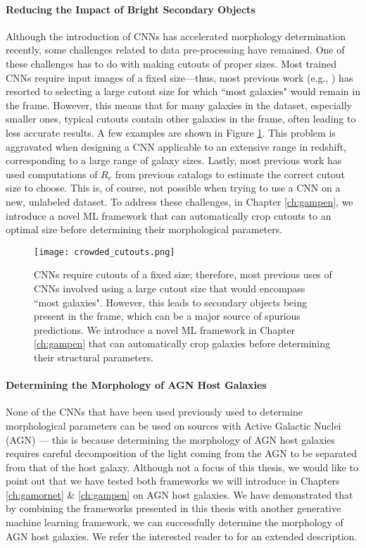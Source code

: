\paragraph{Reducing the Impact of Bright Secondary Objects} Although the introduction of CNNs has accelerated morphology determination recently, some challenges related to data pre-processing have remained. One of these challenges has to do with making cutouts of proper sizes. Most trained CNNs require input images of a fixed size---thus, most previous work (e.g., \citealp{Cheng2021GalaxyNetworks, Vega-Ferrero2021PushingSurvey}) has resorted to selecting a large cutout size for which ``most galaxies" would remain in the frame. However, this means that for many galaxies in the dataset, especially smaller ones, typical cutouts contain other galaxies in the frame, often leading to less accurate results. A few examples are shown in Figure \ref{fig_intro:crowded_cutouts}. This problem is aggravated when designing a CNN applicable to an extensive range in redshift, corresponding to a large range of galaxy sizes. Lastly, most previous work has used computations of $R_e$ from previous catalogs to estimate the correct cutout size to choose. This is, of course, not possible when trying to use a CNN on a new, unlabeled dataset. To address these challenges, in Chapter \ref{ch:gampen}, we introduce a novel ML framework that can automatically crop cutouts to an optimal size before determining their morphological parameters. 

\begin{figure}[htbp]
    \centering
    \texttt{[image: crowded\_cutouts.png]}
    \caption{CNNs require cutouts of a fixed size; therefore, most previous uses of CNNs involved using a large cutout size that would encompass ``most galaxies". However, this leads to secondary objects being present in the frame, which can be a major source of spurious predictions. We introduce a novel ML framework in Chapter \ref{ch:gampen} that can automatically crop galaxies before determining their structural parameters.}
    \label{fig_intro:crowded_cutouts}
\end{figure}


\paragraph{Determining the Morphology of AGN Host Galaxies} None of the CNNs that have been used previously used to determine morphological parameters can be used on sources with Active Galactic Nuclei (AGN) --- this is because determining the morphology of AGN host galaxies requires careful decomposition of the light coming from the AGN to be separated from that of the host galaxy. Although not a focus of this thesis, we would like to point out that we have tested both frameworks we will introduce in Chapters \ref{ch:gamornet} \& \ref{ch:gampen} on AGN host galaxies. We have demonstrated that by combining the frameworks presented in this thesis with another generative machine learning framework, we can successfully determine the morphology of AGN host galaxies. We refer the interested reader to \citet{tian_23} for an extended description.

